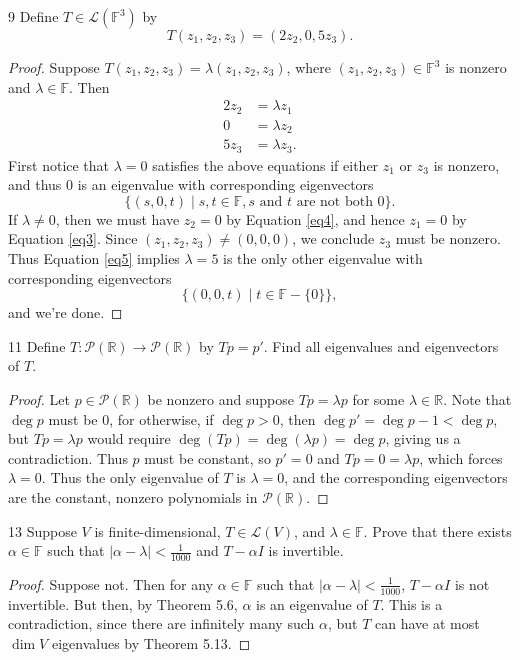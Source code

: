 \documentclass{extarticle}
\newenvironment{problem}[1]{\begin{prob*}{#1}{}}{\end{prob*}}
\newcommand{\R}{\mathbb{R}}
\newcommand{\F}{\mathbb{F}}
\newcommand{\poly}{\mathcal{P}}
\newcommand{\Hom}{\mathcal{L}}
\begin{document}
\begin{problem}{9}
Define $T\in\Hom\left(\F^3\right)$ by
\begin{equation*}
T(z_1, z_2, z_3) = (2z_2, 0, 5z_3).
\end{equation*}
\end{problem}
\begin{proof}
Suppose $T(z_1, z_2, z_3) = \lambda(z_1,z_2,z_3)$, where $(z_1,z_2, z_3)\in\F^3$ is nonzero and $\lambda\in\F$.  Then
\begin{align}
2z_2 &= \lambda z_1\label{eq3} \\
0 &= \lambda z_2 \label{eq4} \\
5z_3 &= \lambda z_3. \label{eq5} 
\end{align}
First notice that $\lambda = 0$ satisfies the above equations if either $z_1$ or $z_3$ is nonzero, and thus $0$ is an eigenvalue with corresponding eigenvectors 
\begin{equation*}
\{(s, 0, t)\mid s,t\in\F, s\text{ and }t\text{ are not both }0\}.
\end{equation*}  
If $\lambda\neq 0$, then we must have $z_2 = 0$ by Equation \ref{eq4}, and hence $z_1 = 0$ by Equation \ref{eq3}.  Since $(z_1,z_2, z_3)\neq (0, 0, 0)$, we conclude $z_3$ must be nonzero.  Thus Equation \ref{eq5} implies $\lambda = 5$ is the only other eigenvalue with corresponding eigenvectors
\begin{equation*} 
\{(0, 0, t)\mid t\in\F-\{0\}\},
\end{equation*}
and we're done.
\end{proof}

\begin{problem}{11}
Define $T:\poly(\R)\to\poly(\R)$ by $Tp = p'$.  Find all eigenvalues and eigenvectors of $T$.
\end{problem}
\begin{proof}
Let $p\in\poly(\R)$ be nonzero and suppose $Tp = \lambda p$ for some $\lambda\in\R$.  Note that $\deg p$ must be $0$, for otherwise, if $\deg p > 0$, then $\deg p' = \deg p - 1 < \deg p$, but $Tp = \lambda p$ would require $\deg(Tp) = \deg(\lambda p) = \deg p$, giving us a contradiction.  Thus $p$ must be constant, so $p' = 0$ and $Tp = 0 = \lambda p$, which forces $\lambda = 0$.  Thus the only eigenvalue of $T$ is $\lambda = 0$, and the corresponding eigenvectors are the constant, nonzero polynomials in $\poly(\R)$.  
\end{proof}

\begin{problem}{13}
Suppose $V$ is finite-dimensional, $T\in\Hom(V)$, and $\lambda\in\F$.  Prove that there exists $\alpha\in\F$ such that $\left|\alpha-\lambda\right| < \frac{1}{1000}$ and $T-\alpha I$ is invertible.
\end{problem}
\begin{proof}
Suppose not.  Then for any $\alpha\in\F$ such that $\left|\alpha-\lambda\right| < \frac{1}{1000}$, $T - \alpha I$ is not invertible.  But then, by Theorem 5.6, $\alpha$ is an eigenvalue of $T$.  This is a contradiction, since there are infinitely many such $\alpha$, but $T$ can have at most $\dim V$ eigenvalues by Theorem 5.13. 
\end{proof} 
\end{document}
